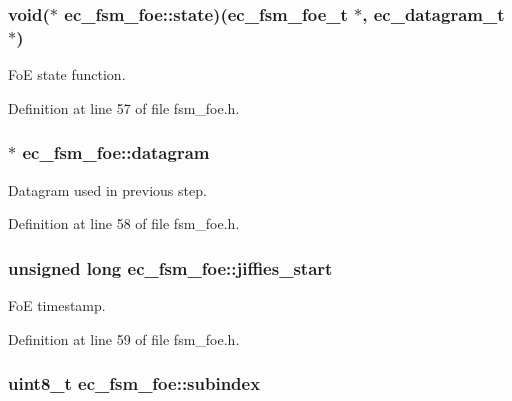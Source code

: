 \subsubsection[{state}]{\setlength{\rightskip}{0pt plus 5cm}void($\ast$ ec\-\_\-fsm\-\_\-foe\-::state)({\bf ec\-\_\-fsm\-\_\-foe\-\_\-t} $\ast$, {\bf ec\-\_\-datagram\-\_\-t} $\ast$)}\label{structec__fsm__foe_a54f3559cf8f73871bf1035c6e89c4f59}


Fo\-E state function. 



Definition at line 57 of file fsm\-\_\-foe.\-h.

\subsubsection[{datagram}]{$\ast$ ec\-\_\-fsm\-\_\-foe\-::datagram}\label{structec__fsm__foe_a19c8a77b4f92a3813f23262c3c89dbfc}


Datagram used in previous step. 



Definition at line 58 of file fsm\-\_\-foe.\-h.

\subsubsection[{jiffies\-\_\-start}]{\setlength{\rightskip}{0pt plus 5cm}unsigned long ec\-\_\-fsm\-\_\-foe\-::jiffies\-\_\-start}\label{structec__fsm__foe_a42f6c78ac58392cab6a186e5dd43a992}


Fo\-E timestamp. 



Definition at line 59 of file fsm\-\_\-foe.\-h.

\subsubsection[{subindex}]{\setlength{\rightskip}{0pt plus 5cm}uint8\-\_\-t ec\-\_\-fsm\-\_\-foe\-::subindex}\label{structec__fsm__foe_a14293bb60b8829e96d5463d412dff4e0}


